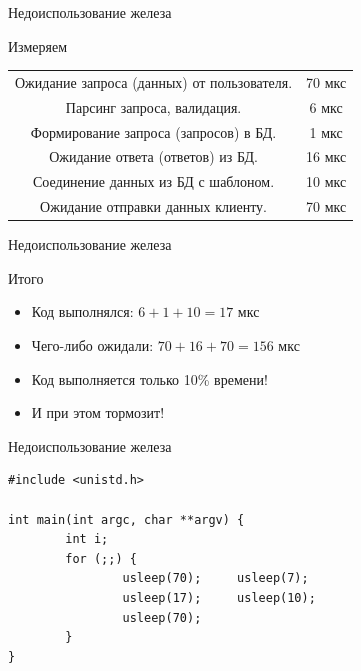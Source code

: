 \documentclass[aspectratio=169]{beamer}
\begin{document}
\begin{frame}{Недоиспользование железа}
    \begin{block}{Измеряем}
        \begin{tabular}{ c c }
            Ожидание запроса (данных) от пользователя. & 70 мкс \\
            Парсинг запроса, валидация.  & 6 мкс \\
            Формирование запроса (запросов) в БД. & 1 мкс \\
            Ожидание ответа (ответов) из БД. & 16 мкс \\
            Соединение данных из БД с шаблоном. & 10 мкс\\
            Ожидание отправки данных клиенту. & 70 мкс \\
        \end{tabular}
    \end{block}
\end{frame}

\begin{frame}{Недоиспользование железа}
    \begin{block}{Итого}
        \begin{itemize}
            \item Код выполнялся: $6 + 1 + 10 = 17$ мкс
            \item Чего-либо ожидали: $70 + 16 + 70 = 156$ мкс
            \pause\item {\large Код выполняется только 10\% времени!}
            \item И при этом тормозит!
        \end{itemize}
    \end{block}
\end{frame}

\begin{frame}[fragile]{Недоиспользование железа}
\begin{verbatim}
#include <unistd.h>

int main(int argc, char **argv) {
        int i;
        for (;;) {
                usleep(70);     usleep(7);
                usleep(17);     usleep(10);
                usleep(70);
        }
}
\end{verbatim}
\end{frame}
\end{document}
